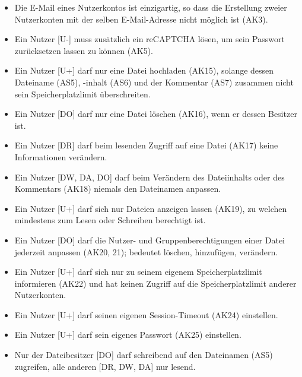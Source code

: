 \documentclass[fontsize=12pt,DIV=14,BCOR=10mm,a4paper,parskip=half-,headsepline,headinclude,english,ngerman,bibliography=totocnumbered]{scrreprt}
\begin{document}
\begin{itemize}
  \item Die E-Mail eines Nutzerkontos ist einzigartig, so dass die Erstellung zweier Nutzerkonten mit der selben E-Mail-Adresse nicht möglich ist (AK3).
  \item Ein Nutzer [U-] muss zusätzlich ein reCAPTCHA lösen, um sein Passwort zurücksetzen lassen zu können (AK5).
  \item Ein Nutzer [U+] darf nur eine Datei hochladen (AK15), solange dessen Dateiname (AS5), -inhalt (AS6) und der Kommentar (AS7) zusammen nicht sein Speicherplatzlimit überschreiten.
  \item Ein Nutzer [DO] darf nur eine Datei löschen (AK16), wenn er dessen Besitzer ist.
  \item Ein Nutzer [DR] darf beim lesenden Zugriff auf eine Datei (AK17) keine Informationen verändern.
  \item Ein Nutzer [DW, DA, DO] darf beim Verändern des Dateiinhalts oder des Kommentars (AK18) niemals den Dateinamen anpassen.
  \item Ein Nutzer [U+] darf sich nur Dateien anzeigen lassen (AK19), zu welchen mindestens zum Lesen oder Schreiben berechtigt ist.
  \item Ein Nutzer [DO] darf die Nutzer- und Gruppenberechtigungen einer Datei jederzeit anpassen (AK20, 21); bedeutet löschen, hinzufügen, verändern.
  \item Ein Nutzer [U+] darf sich nur zu seinem eigenem Speicherplatzlimit informieren (AK22) und hat keinen Zugriff auf die Speicherplatzlimit anderer Nutzerkonten.
  \item Ein Nutzer [U+] darf seinen eigenen Session-Timeout (AK24) einstellen.
  \item Ein Nutzer [U+] darf sein eigenes Passwort (AK25) einstellen.
  \item Nur der Dateibesitzer [DO] darf schreibend auf den Dateinamen (AS5) zugreifen, alle anderen [DR, DW, DA] nur lesend.
\end{itemize}

\printbibliography

\printacronyms[title=Abkürzungsverzeichnis,toctitle=Abkürzungsverzeichnis]
\printglossary[title=Glossar,toctitle=Glossar,type=main]

\iftotalfigures
  \listoffigures
\fi
\end{document}

